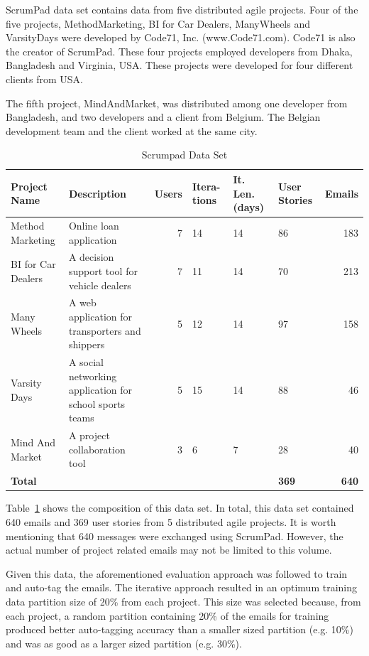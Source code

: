 ScrumPad data set contains data from five distributed agile projects. Four of the five projects, MethodMarketing, BI for Car Dealers, ManyWheels and VarsityDays were developed by Code71, Inc. (www.Code71.com). Code71 is also the creator of ScrumPad. These four projects employed developers from Dhaka, Bangladesh and Virginia, USA. These projects were developed for four different clients from USA.

The fifth project, MindAndMarket, was distributed among one developer from Bangladesh, and two developers and a client from Belgium. The Belgian development team and the client worked at the same city.

\begin{table}[h!]
  \centering
  \caption{Scrumpad Data Set}
	\label{tab:scrumpad_data_set}
    \begin{tabular}{|p{2cm}|p{4cm}|r|p{1cm}|p{1.2cm}|p{1.2cm}|r|}
      \hline
      \textbf{Project Name} & \textbf{Description} & \textbf{Users} & \textbf{Itera- tions} & \textbf{It. Len. (days)}  & \textbf{User Stories} & \textbf{Emails}\\
      \hline
      Method Marketing & Online loan application & 7 & 14 & 14 & 86 & 183 \\
      \hline
      BI for Car Dealers & A decision support tool for vehicle dealers & 7 & 11 & 14 & 70 & 213 \\
      \hline
      Many Wheels & A web application for transporters and shippers & 5 & 12 & 14 & 97 & 158 \\
      \hline
      Varsity Days & A social networking application for school sports teams & 5 & 15 & 14 & 88 & 46 \\
      \hline
      Mind And Market & A project collaboration tool & 3 & 6 & 7 & 28 & 40 \\
      \hline
      \textbf{Total} &  &  &  &  & \textbf{369} & \textbf{640}\\
      \hline
    \end{tabular}
\end{table}

Table~\ref{tab:scrumpad_data_set} shows the composition of this data set. In total, this data set contained 640 emails and 369 user stories from 5 distributed agile projects. It is worth mentioning that 640 messages were exchanged using ScrumPad. However, the actual number of project related emails may not be limited to this volume.

Given this data, the aforementioned evaluation approach was followed to train and auto-tag the emails. The iterative approach resulted in an optimum  training data partition size of 20\% from each project. This size was selected because, from each project, a random partition containing 20\% of the emails for training produced better auto-tagging accuracy than a smaller sized partition (e.g. 10\%) and was as good as a larger sized partition (e.g. 30\%). 


